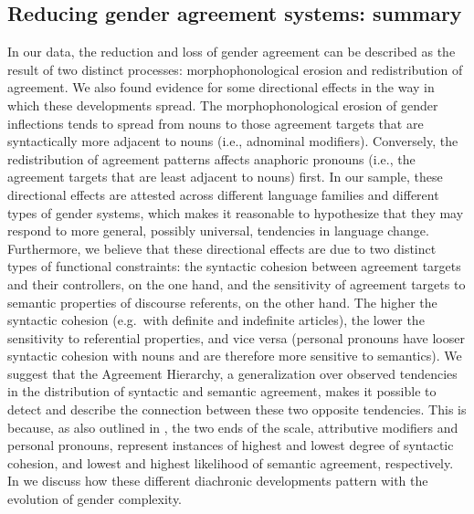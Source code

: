 \documentclass[output=collectionpaper]{langsci/langscibook}
\begin{document}
\subsection{Reducing gender agreement systems: summary}


In our data, the reduction and loss of gender agreement can be described as the result of two distinct processes: morphophonological erosion and redistribution of agreement. We also found evidence for some directional effects in the way in which these developments spread. The morphophonological erosion of gender inflections tends to spread from nouns to those agreement targets that are syntactically more adjacent to nouns (i.e., adnominal modifiers). Conversely, the redistribution of agreement patterns affects anaphoric pronouns (i.e., the agreement targets that are least adjacent to nouns) first.  In our sample, these directional effects are attested across different language families and different types of gender systems, which makes it reasonable to hypothesize that they may respond to more general, possibly universal, tendencies in language change. Furthermore, we believe that these directional effects are due to two distinct types of functional constraints: the syntactic cohesion between agreement targets and their controllers, on the one hand, and the sensitivity of agreement targets to semantic properties of discourse referents, on the other hand.  The higher the syntactic cohesion (e.g.\ with definite and indefinite articles), the lower the sensitivity to referential properties, and vice versa (personal pronouns have looser syntactic cohesion with nouns and are therefore more sensitive to semantics). We suggest that the Agreement Hierarchy, a generalization over observed tendencies in the distribution of syntactic and semantic agreement, makes it possible to detect and describe the connection between these two opposite tendencies. This is because, as also outlined in , the two ends of the scale, attributive modifiers and personal pronouns, represent instances of highest and lowest degree of syntactic cohesion, and lowest and highest likelihood of semantic agreement, respectively. In  we discuss how these different diachronic developments pattern with the evolution of gender complexity.
\end{document}
